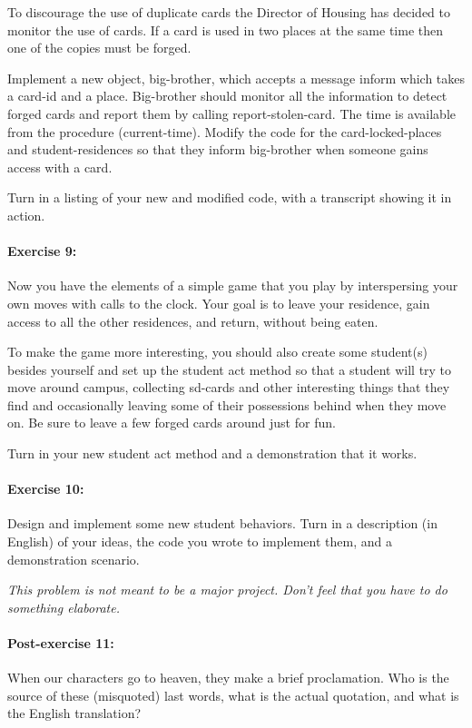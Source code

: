 To discourage the use of duplicate cards the Director of Housing has
decided to monitor the use of cards.  If a card is used in two places
at the same time then one of the copies must be forged.

Implement a new object, {\cf big-brother}, which accepts a message
{\cf inform} which takes a card-id and a place.  {\cf Big-brother}
should monitor all the information to detect forged cards and report
them by calling {\cf report-stolen-card}.  The time is available from
the procedure {\cf (current-time)}.  Modify the code for the
card-locked-places and student-residences so that they inform {\cf
big-brother} when someone gains access with a card.

Turn in a listing of your new and modified code, with a transcript
showing it in action.


\paragraph{Exercise 9:}

Now you have the elements of a simple game that you play by
interspersing your own moves with calls to the clock.  Your goal is to
leave your residence, gain access to all the other residences, and
return, without being eaten.

To make the game more interesting, you should also create some
student(s) besides yourself and set up the student {\cf act} method so
that a student will try to move around campus, collecting sd-cards and
other interesting things that they find and occasionally leaving some
of their possessions behind when they move on.
Be sure to leave a few forged cards around just for fun.

Turn in your new student {\cf act} method and a demonstration that it
works.

\paragraph{Exercise 10:}

Design and implement some new student behaviors. Turn in a description
(in English) of your ideas, the code you wrote to implement them, and
a demonstration scenario.

{\em This problem is not meant to be a major project.  Don't feel that
you have to do something elaborate.}


\paragraph{Post-exercise 11:}
When our characters go to heaven, they make a brief proclamation.
Who is the source of these (misquoted) last words, what is the actual
quotation, and what is the English translation?


